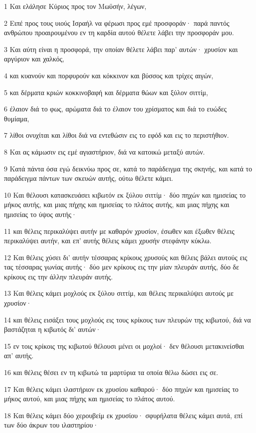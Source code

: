 \par 1 Και ελάλησε Κύριος προς τον Μωϋσήν, λέγων,
\par 2 Ειπέ προς τους υιούς Ισραήλ να φέρωσι προς εμέ προσφοράν· παρά παντός ανθρώπου προαιρουμένου εν τη καρδία αυτού θέλετε λάβει την προσφοράν μου.
\par 3 Και αύτη είναι η προσφορά, την οποίαν θέλετε λάβει παρ' αυτών· χρυσίον και αργύριον και χαλκός,
\par 4 και κυανούν και πορφυρούν και κόκκινον και βύσσος και τρίχες αιγών,
\par 5 και δέρματα κριών κοκκινοβαφή και δέρματα θώων και ξύλον σιττίμ,
\par 6 έλαιον διά το φως, αρώματα διά το έλαιον του χρίσματος και διά το ευώδες θυμίαμα,
\par 7 λίθοι ονυχίται και λίθοι διά να εντεθώσιν εις το εφόδ και εις το περιστήθιον.
\par 8 Και ας κάμωσιν εις εμέ αγιαστήριον, διά να κατοικώ μεταξύ αυτών.
\par 9 Κατά πάντα όσα εγώ δεικνύω προς σε, κατά το παράδειγμα της σκηνής, και κατά το παράδειγμα πάντων των σκευών αυτής, ούτω θέλετε κάμει.
\par 10 Και θέλουσι κατασκευάσει κιβωτόν εκ ξύλου σιττίμ· δύο πηχών και ημισείας το μήκος αυτής, και μιας πήχης και ημισείας το πλάτος αυτής, και μιας πήχης και ημισείας το ύψος αυτής·
\par 11 και θέλεις περικαλύψει αυτήν με καθαρόν χρυσίον, έσωθεν και έξωθεν θέλεις περικαλύψει αυτήν, και επ' αυτής θέλεις κάμει χρυσήν στεφάνην κύκλω.
\par 12 Και θέλεις χύσει δι' αυτήν τέσσαρας κρίκους χρυσούς και θέλεις βάλει αυτούς εις τας τέσσαρας γωνίας αυτής· δύο μεν κρίκους εις την μίαν πλευράν αυτής, δύο δε κρίκους εις την άλλην πλευράν αυτής.
\par 13 Και θέλεις κάμει μοχλούς εκ ξύλου σιττίμ, και θέλεις περικαλύψει αυτούς με χρυσίον·
\par 14 και θέλεις εισάξει τους μοχλούς εις τους κρίκους των πλευρών της κιβωτού, διά να βαστάζηται η κιβωτός δι' αυτών·
\par 15 εν τοις κρίκοις της κιβωτού θέλουσι μένει οι μοχλοί· δεν θέλουσι μετακινείσθαι απ' αυτής.
\par 16 και θέλεις θέσει εν τη κιβωτώ τα μαρτύρια τα οποία θέλω δώσει εις σε.
\par 17 Και θέλεις κάμει ιλαστήριον εκ χρυσίου καθαρού· δύο πηχών και ημισείας το μήκος αυτού, και μιας πήχης και ημισείας το πλάτος αυτού.
\par 18 Και θέλεις κάμει δύο χερουβείμ εκ χρυσίου· σφυρήλατα θέλεις κάμει αυτά, επί των δύο άκρων του ιλαστηρίου·
